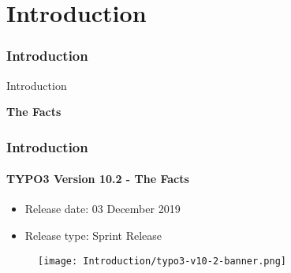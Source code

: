 %

\section{Introduction}
\begin{frame}[fragile]
	\frametitle{Introduction}

	\begin{center}\huge{Introduction}\end{center}
	\begin{center}\huge{\color{typo3darkgrey}\textbf{The Facts}}\end{center}

\end{frame}


\begin{frame}[fragile]
	\frametitle{Introduction}
	\framesubtitle{TYPO3 Version 10.2 - The Facts}

	\begin{itemize}
		\item Release date: 03 December 2019
		\item Release type: Sprint Release
	\end{itemize}

	\begin{figure}
		\texttt{[image: Introduction/typo3-v10-2-banner.png]}
	\end{figure}

\end{frame}


